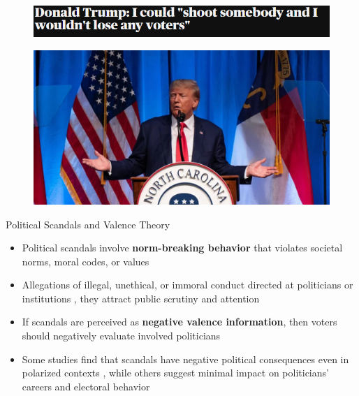 \documentclass[9pt, aspectratio=169]{beamer}
\newcommand{\customcite}[1]{\textcolor{blue}{\footnotesize\parencite{#1}}}
\newcommand{\customcites}[1]{\textcolor{blue}{\footnotesize\parencites{#1}}}
\begin{document}
\begin{frame} %
    \begin{figure}
        \centering
        \includegraphics[width=\linewidth]{images/Trump1.png}
        \label{fig:trump1}
    \end{figure}
        \begin{figure}
        \centering
        \includegraphics[width=0.7\linewidth]{images/Trump2.jpg}
        \label{fig:trump2}
    \end{figure}
\end{frame}

\begin{frame}{Political Scandals and Valence Theory}
    \begin{itemize}
        \item Political scandals involve \textbf{norm-breaking behavior} that violates societal norms, moral codes, or values \customcites{genovese_2010, Thompson_2013} \vspace{0.3cm}
        \item Allegations of illegal, unethical, or immoral conduct directed at politicians or institutions \customcite{Rottinghaus_2023}, they attract public scrutiny and attention \customcites{Thompson_2013, Marion_2010}\vspace{0.2cm}
        \item If scandals are perceived as \textbf{negative valence information}, then voters should negatively evaluate involved politicians \customcites{doherty2014does, Rottinghaus_2023} \vspace{0.3cm}
        \item Some studies find that scandals have negative political consequences even in polarized contexts \customcites{darr2019collision, wolsky2022scandal}, while others suggest minimal impact on politicians' careers and electoral behavior \customcites{funck2021partisanship, Lee_2023}
    \end{itemize}
\end{frame}
\end{document}
